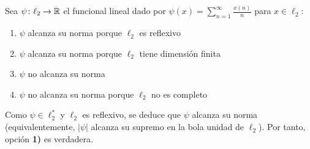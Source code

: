 \documentclass[12pt]{article}
\begin{document}
\begin{ejercicio}
    Sea $\psi \colon \ell_2 \to \mathbb{R}$ el funcional lineal dado por $\psi(x) = \sum\limits_{n=1}^\infty \frac{x(n)}{n}$ para $x \in \ell_2$:
    \begin{enumerate}[label={\arabic*)}]
        \item $\psi$ alcanza su norma porque $\ell_2$ es reflexivo
        \item $\psi$ alcanza su norma porque $\ell_2$ tiene dimensión finita
        \item $\psi$ no alcanza su norma
        \item $\psi$ no alcanza su norma porque $\ell_2$ no es completo
    \end{enumerate}

    Como $\psi\in \ell_2^*$ y $\ell_2$ es reflexivo, se deduce que $\psi$ alcanza su norma (equivalentemente, $|\psi|$ alcanza su supremo en la bola unidad de $\ell_2$). Por tanto, opción \textbf{1)} es verdadera.
\end{ejercicio}
\end{document}
